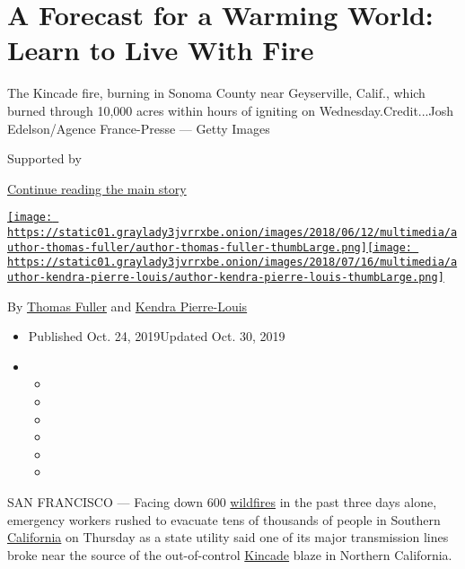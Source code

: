 \hypertarget{a-forecast-for-a-warming-world-learn-to-live-with-fire}{%
\section{A Forecast for a Warming World: Learn to Live With
Fire}\label{a-forecast-for-a-warming-world-learn-to-live-with-fire}}

The Kincade fire, burning in Sonoma County near Geyserville, Calif.,
which burned through 10,000 acres within hours of igniting on
Wednesday.Credit...Josh Edelson/Agence France-Presse --- Getty Images

Supported by

\protect\hyperlink{after-sponsor}{Continue reading the main story}

\href{https://www.nytimes3xbfgragh.onion/by/thomas-fuller}{\texttt{[image: https://static01.graylady3jvrrxbe.onion/images/2018/06/12/multimedia/author-thomas-fuller/author-thomas-fuller-thumbLarge.png]}}\href{https://www.nytimes3xbfgragh.onion/by/kendra-pierre-louis}{\texttt{[image: https://static01.graylady3jvrrxbe.onion/images/2018/07/16/multimedia/author-kendra-pierre-louis/author-kendra-pierre-louis-thumbLarge.png]}}

By \href{https://www.nytimes3xbfgragh.onion/by/thomas-fuller}{Thomas
Fuller} and
\href{https://www.nytimes3xbfgragh.onion/by/kendra-pierre-louis}{Kendra
Pierre-Louis}

\begin{itemize}
\item
  Published Oct. 24, 2019Updated Oct. 30, 2019
\item
  \begin{itemize}
  \item
  \item
  \item
  \item
  \item
  \item
  \end{itemize}
\end{itemize}

SAN FRANCISCO --- Facing down 600
\href{https://www.nytimes3xbfgragh.onion/2019/10/28/us/california-fires-getty-kincade-tick-sonoma-county.html}{wildfires}
in the past three days alone, emergency workers rushed to evacuate tens
of thousands of people in Southern
\href{https://www.nytimes3xbfgragh.onion/2019/10/24/us/california-fires-today.html}{California}
on Thursday as a state utility said one of its major transmission lines
broke near the source of the out-of-control
\href{https://www.nytimes3xbfgragh.onion/2019/10/24/us/california-fires-today.html}{Kincade}
blaze in Northern California.

